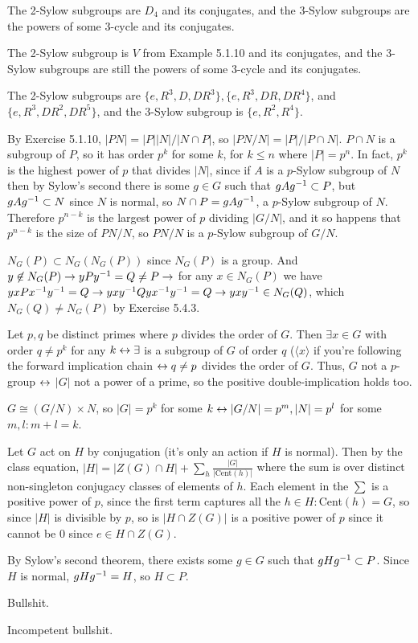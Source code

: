 \documentclass[11pt, oneside]{article}   	%
\begin{document}
\item The 2-Sylow subgroups are $D_4$ and its conjugates, and the 3-Sylow subgroups are the powers of some 3-cycle and its conjugates.
\item The 2-Sylow subgroup is $V$ from Example 5.1.10 and its conjugates, and the 3-Sylow subgroups are still the powers of some 3-cycle and its conjugates.
\item The 2-Sylow subgroups are $\{e, R^3, D, DR^3\}, \{e, R^3, DR, DR^4\}$, and $\{e, R^3, DR^2, DR^5\}$, and the 3-Sylow subgroup is $\{e, R^2, R^4\}$. 
\item By Exercise 5.1.10, $|PN| = |P||N|/|N\cap P|$, so $|PN/N| = |P|/|P\cap N|$. $P\cap N$ is a subgroup of $P$, so it has order $p^k$ for some $k$, for $k \le n$ where $|P| = p^n$. In fact, $p^k$ is the highest power of $p$ that divides $|N|$, since if $A$ is a $p$-Sylow subgroup of $N$ then by Sylow's second there is some $g \in G$ such that $gAg^{-1} \subset P$, but $gAg^{-1} \subset N$ since $N$ is normal, so $N \cap P = gAg^{-1}$, a $p$-Sylow subgroup of $N$. Therefore $p^{n-k}$ is the largest power of $p$ dividing $|G/N|$, and it so happens that $p^{n-k}$ is the size of $PN/N$, so $PN/N$ is a $p$-Sylow subgroup of $G/N$.
\item $N_G(P) \subset N_G(N_G(P))$ since $N_G(P)$ is a group. And $y \not \in N_G(P) \rightarrow yPy^{-1} = Q \not = P \rightarrow $ for any $x \in N_G(P)$ we have $yxPx^{-1} y^{-1} = Q \rightarrow yxy^{-1} Q yx^{-1} y^{-1} = Q \rightarrow yxy^{-1} \in N_G(Q)$, which $N_G(Q) \not = N_G(P)$ by Exercise 5.4.3.
\item Let $p, q$ be distinct primes where $p$ divides the order of $G$. Then $\exists x\in G$ with order $q \not = p^k$ for any $k \leftrightarrow \exists$ is a subgroup of $G$ of order $q$ ($\langle x \rangle$ if you're following the forward implication chain $\leftrightarrow q \not=p$ divides the order of $G$. Thus, $G$ not a $p$-group $\leftrightarrow$ $|G|$ not a power of a prime, so the positive double-implication holds too.
\item $G \cong (G/N) \times N$, so $|G| = p^k$ for some $k \leftrightarrow |G/N| = p^m, |N| = p^l$ for some $m, l: m + l = k$.
\item Let $G$ act on $H$ by conjugation (it's only an action if $H$ is normal). Then by the class equation, $|H| = |Z(G) \cap H| + \sum_h\frac{|G|}{|\text{Cent}(h)|}$ where the sum is over distinct non-singleton conjugacy classes of elements of $h$. Each element in the $\sum$ is a positive power of $p$, since the first term captures all the $h \in H: $Cent$(h) = G$, so since $|H|$ is divisible by $p$, so is $|H \cap Z(G)|$ is a positive power of $p$ since it cannot be 0 since $e \in H \cap Z(G)$. 
\item By Sylow's second theorem, there exists some $g \in G$ such that $gHg^{-1} \subset P$. Since $H$ is normal, $gHg^{-1} = H$, so $H \subset P$.
\item Bullshit.
\item Incompetent bullshit.
\ee
\end{document}
